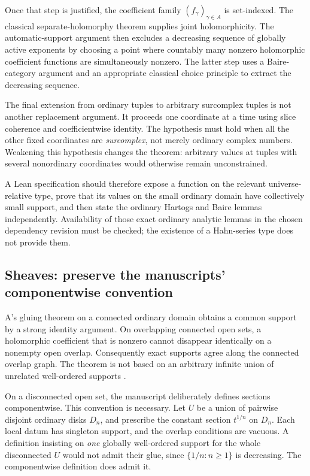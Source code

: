 \documentclass[11pt,letterpaper]{article}
\numberwithin{equation}{section}
\theoremstyle{definition}
\theoremstyle{remark}
\begin{document}
Once that step is justified, the coefficient family $(f_\gamma)_{\gamma\in A}$ is set-indexed. The classical separate-holomorphy theorem supplies joint holomorphicity. The automatic-support argument then excludes a decreasing sequence of globally active exponents by choosing a point where countably many nonzero holomorphic coefficient functions are simultaneously nonzero. The latter step uses a Baire-category argument and an appropriate classical choice principle to extract the decreasing sequence.

The final extension from ordinary tuples to arbitrary surcomplex tuples is not another replacement argument. It proceeds one coordinate at a time using slice coherence and coefficientwise identity. The hypothesis must hold when all the other fixed coordinates are \emph{surcomplex}, not merely ordinary complex numbers. Weakening this hypothesis changes the theorem: arbitrary values at tuples with several nonordinary coordinates would otherwise remain unconstrained.

A Lean specification should therefore expose a function on the relevant universe-relative type, prove that its values on the small ordinary domain have collectively small support, and then state the ordinary Hartogs and Baire lemmas independently. Availability of those exact ordinary analytic lemmas in the chosen dependency revision must be checked; the existence of a Hahn-series type does not provide them.

\subsection{Sheaves: preserve the manuscripts' componentwise convention}
A's gluing theorem on a connected ordinary domain obtains a common support by a strong identity argument. On overlapping connected open sets, a holomorphic coefficient that is nonzero cannot disappear identically on a nonempty open overlap. Consequently exact supports agree along the connected overlap graph. The theorem is not based on an arbitrary infinite union of unrelated well-ordered supports \cite{SourceA}.

On a disconnected open set, the manuscript deliberately defines sections componentwise. This convention is necessary. Let $U$ be a union of pairwise disjoint ordinary disks $D_n$, and prescribe the constant section $t^{1/n}$ on $D_n$. Each local datum has singleton support, and the overlap conditions are vacuous. A definition insisting on \emph{one} globally well-ordered support for the whole disconnected $U$ would not admit their glue, since $\{1/n:n\ge1\}$ is decreasing. The componentwise definition does admit it.
\end{document}
